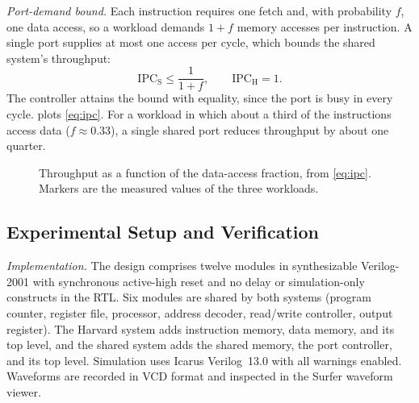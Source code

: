 \documentclass[conference]{IEEEtran}
\begin{document}
\textit{Port-demand bound.} Each instruction requires one fetch and, with probability $f$, one data
access, so a workload demands $1+f$ memory accesses per instruction. A single port supplies at most
one access per cycle, which bounds the shared system's throughput:
\begin{equation}
  \mathrm{IPC}_{\mathrm{S}} \le \frac{1}{1+f}, \qquad \mathrm{IPC}_{\mathrm{H}} = 1 .
  \label{eq:ipc}
\end{equation}
The controller attains the bound with equality, since the port is busy in every cycle.
 plots \eqref{eq:ipc}. For a workload in which about a third of the instructions
access data ($f \approx 0.33$), a single shared port reduces throughput by about one quarter.

\begin{figure}[t]
\centering
{}
\caption{Throughput as a function of the data-access fraction, from \eqref{eq:ipc}. Markers are the
measured values of the three workloads.}
\label{fig:ipc}
\end{figure}

\subsection{Experimental Setup and Verification}
\label{sec:method}
\textit{Implementation.} The design comprises twelve modules in synthesizable Verilog-2001
with synchronous active-high reset and no delay or simulation-only constructs in the RTL. Six modules
are shared by both systems (program counter, register file, processor, address decoder, read/write
controller, output register). The Harvard system adds instruction memory, data memory, and its top
level, and the shared system adds the shared memory, the port controller, and its top level.
Simulation uses Icarus Verilog~13.0 with all warnings enabled. Waveforms are recorded in VCD format
and inspected in the Surfer waveform viewer.
\end{document}
